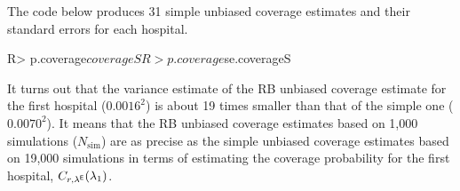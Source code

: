 \documentclass[article]{jss}
\begin{document}
The code below produces 31 simple unbiased coverage estimates and their standard errors for each hospital.
\begin{CodeChunk}
\begin{CodeInput}
R> p.coverage$coverageS
R> p.coverage$se.coverageS
\end{CodeInput}
\end{CodeChunk}



It turns out that the variance estimate of the RB unbiased coverage estimate for the first hospital ($0.0016^2$) is about 19 times smaller than that of the simple one ($0.0070^2$). It means that the RB unbiased coverage estimates based on 1,000 simulations ($N_{\textrm{sim}}$) are as precise as the simple unbiased coverage estimates based on 19,000 simulations in terms of estimating the coverage probability for the first hospital, $C_{r, \lambda^{\mathsf{E}}}(\lambda_1)$.
\end{document}
